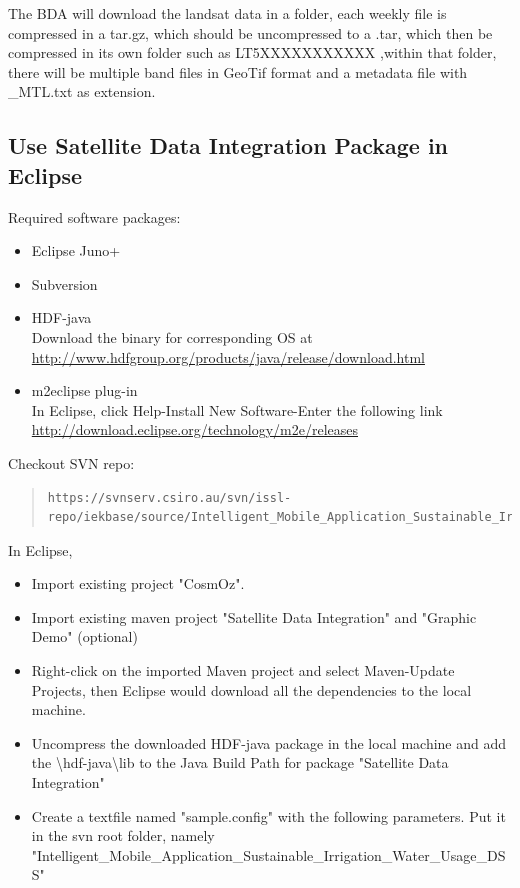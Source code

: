 The BDA will download the landsat data in a folder, each weekly file is compressed in a tar.gz, which should be uncompressed to a .tar, which then be compressed in its own folder such as LT5XXXXXXXXXXX ,within that folder, there will be multiple band files in GeoTif format and a metadata file with \_MTL.txt as extension.


\subsection{Use Satellite Data Integration Package in Eclipse}
Required software packages:
\begin{itemize}
\item
Eclipse Juno+
\item
Subversion
\item
HDF-java\\
Download the binary for corresponding OS at \\
		\href{http://www.hdfgroup.org/products/java/release/download.html}{http://www.hdfgroup.org/products/java/release/download.html}
\item
m2eclipse plug-in\\
In Eclipse, click Help-Install New Software-Enter the following link\\
\href{http://download.eclipse.org/technology/m2e/releases}{http://download.eclipse.org/technology/m2e/releases}
\end{itemize}
Checkout SVN repo:
\begin{quote}\begin{lstlisting}
https://svnserv.csiro.au/svn/issl-repo/iekbase/source/Intelligent_Mobile_Application_Sustainable_Irrigation_Water_Usage_DSS/
\end{lstlisting}\end{quote}
In Eclipse,
\begin{itemize}
\item
Import existing project "CosmOz".
\item
Import existing maven project "Satellite Data Integration" and "Graphic Demo" (optional)
\item
Right-click on the imported Maven project and select Maven-Update Projects, then Eclipse would download all the dependencies to the local machine.
\item
Uncompress the downloaded HDF-java package in the local machine and add the \textbackslash hdf-java\textbackslash  lib to the Java Build Path for package "Satellite Data Integration"
\item
Create a textfile named "sample.config" with the following parameters. Put it in the svn root folder, namely
\\"Intelligent\_Mobile\_Application\_Sustainable\_Irrigation\_Water\_Usage\_DSS"
\end{itemize}
